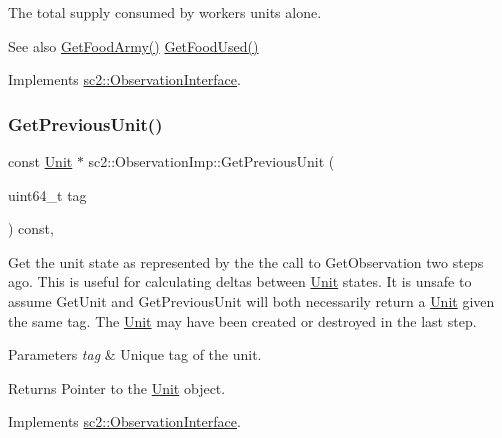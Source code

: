 The total supply consumed by workers units alone. \begin{DoxySeeAlso}{See also}
\hyperlink{classsc2_1_1_observation_imp_a97f6013fc1578cc1db1266d39edab7c4}{Get\+Food\+Army()} \hyperlink{classsc2_1_1_observation_imp_a5489d7a3c6095b29c82e835bb3eb2aba}{Get\+Food\+Used()} 
\end{DoxySeeAlso}


Implements \hyperlink{classsc2_1_1_observation_interface_a19f0bdd8df647ee935dbe6f3c50d64e7}{sc2\+::\+Observation\+Interface}.

\mbox{\label{classsc2_1_1_observation_imp_ae0f23420019a31bf108d4ce9eec62cc9}} 
\subsubsection{\texorpdfstring{Get\+Previous\+Unit()}{GetPreviousUnit()}}
{\footnotesize\ttfamily const \hyperlink{classsc2_1_1_unit}{Unit} $\ast$ sc2\+::\+Observation\+Imp\+::\+Get\+Previous\+Unit (\begin{DoxyParamCaption}\item[{uint64\+\_\+t}]{tag }\end{DoxyParamCaption}) const\hspace{0.3cm}{\ttfamily [final]}, {\ttfamily [virtual]}}

Get the unit state as represented by the the call to Get\+Observation two steps ago. This is useful for calculating deltas between \hyperlink{classsc2_1_1_unit}{Unit} states. It is unsafe to assume Get\+Unit and Get\+Previous\+Unit will both necessarily return a \hyperlink{classsc2_1_1_unit}{Unit} given the same tag. The \hyperlink{classsc2_1_1_unit}{Unit} may have been created or destroyed in the last step. 
\begin{DoxyParams}{Parameters}
{\em tag} & Unique tag of the unit. \\
\hline
\end{DoxyParams}
\begin{DoxyReturn}{Returns}
Pointer to the \hyperlink{classsc2_1_1_unit}{Unit} object. 
\end{DoxyReturn}


Implements \hyperlink{classsc2_1_1_observation_interface_a8d642207367f3000ca877f5914073bad}{sc2\+::\+Observation\+Interface}.

